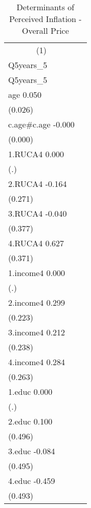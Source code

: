 \begin{table}[H]\centering
\caption{Determinants of Perceived Inflation - Overall Price}
\label{tab1}
\begin{tabular}{l*{1}{c}}\toprule
                   \multicolumn{1}{c}{(1)}   \\
                      Q5years\_5   \\
\midrule
Q5years\_5                         \\
age                       0.050   \\
                        (0.026)   \\
c.age#c.age              -0.000   \\
                        (0.000)   \\
1.RUCA4                   0.000   \\
                            (.)   \\
2.RUCA4                  -0.164   \\
                        (0.271)   \\
3.RUCA4                  -0.040   \\
                        (0.377)   \\
4.RUCA4                   0.627   \\
                        (0.371)   \\
1.income4                 0.000   \\
                            (.)   \\
2.income4                 0.299   \\
                        (0.223)   \\
3.income4                 0.212   \\
                        (0.238)   \\
4.income4                 0.284   \\
                        (0.263)   \\
1.educ                    0.000   \\
                            (.)   \\
2.educ                    0.100   \\
                        (0.496)   \\
3.educ                   -0.084   \\
                        (0.495)   \\
4.educ                   -0.459   \\
                        (0.493)   \\

\end{tabular}
\end{table}

